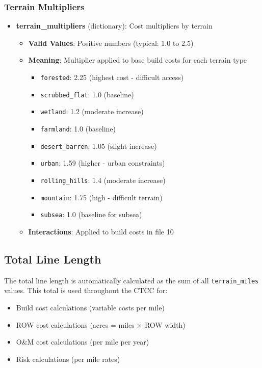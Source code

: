\documentclass[ctcc_full_documentation.tex]{subfiles}
\begin{document}
\subsubsection{Terrain Multipliers}

\begin{itemize}
    \item \textbf{terrain\_multipliers} (dictionary): Cost multipliers by terrain
    \begin{itemize}
        \item \textbf{Valid Values}: Positive numbers (typical: 1.0 to 2.5)
        \item \textbf{Meaning}: Multiplier applied to base build costs for each terrain type
        \begin{itemize}
            \item \texttt{forested}: 2.25 (highest cost - difficult access)
            \item \texttt{scrubbed\_flat}: 1.0 (baseline)
            \item \texttt{wetland}: 1.2 (moderate increase)
            \item \texttt{farmland}: 1.0 (baseline)
            \item \texttt{desert\_barren}: 1.05 (slight increase)
            \item \texttt{urban}: 1.59 (higher - urban constraints)
            \item \texttt{rolling\_hills}: 1.4 (moderate increase)
            \item \texttt{mountain}: 1.75 (high - difficult terrain)
            \item \texttt{subsea}: 1.0 (baseline for subsea)
        \end{itemize}
        \item \textbf{Interactions}: Applied to build costs in file 10
    \end{itemize}
\end{itemize}

\subsection{Total Line Length}

The total line length is automatically calculated as the sum of all \texttt{terrain\_miles} values. This total is used throughout the CTCC for:
\begin{itemize}
    \item Build cost calculations (variable costs per mile)
    \item ROW cost calculations (acres = miles × ROW width)
    \item O\&M cost calculations (per mile per year)
    \item Risk calculations (per mile rates)
\end{itemize}
\end{document}
